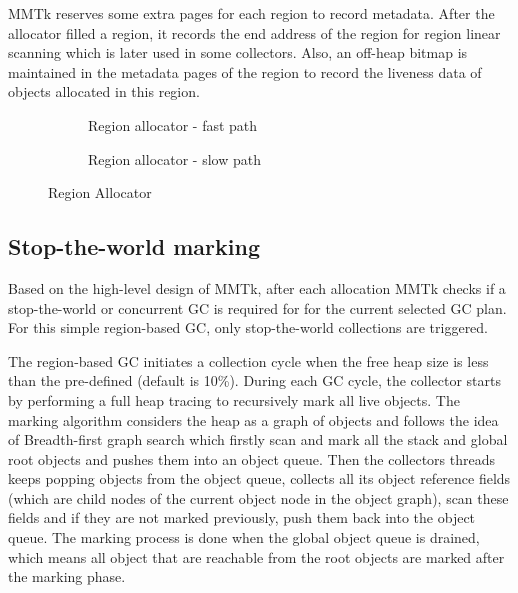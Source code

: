 MMTk reserves some extra pages for each region to record metadata.
After the allocator filled a region, it records the end address of the region for 
region linear scanning which is later used in some collectors. Also, an off-heap bitmap is
maintained in the metadata pages of the region to record the liveness data of objects allocated
in this region.

\begin{figure}
  \centering
  \begin{subfigure}[a]{\textwidth}
    
    \caption{Region allocator - fast path}
    \label{fig:allocator:fast}
  \end{subfigure}

  \begin{subfigure}[b]{\textwidth}
    
    \caption{Region allocator - slow path}
    \label{fig:allocator:slow}
  \end{subfigure}

  \caption{Region Allocator}
  \label{fig:allocator}
\end{figure}

\subsection{Stop-the-world marking}

Based on the high-level design of MMTk, after each allocation MMTk checks if a stop-the-world
or concurrent GC is required for for the current selected GC plan.
For this simple region-based GC, only stop-the-world collections are triggered.

The region-based GC initiates a collection cycle when the free heap size is less than
the pre-defined  (default is 10\%). During each GC cycle,
the collector starts by performing a full heap tracing to recursively mark all live objects.
The marking algorithm considers the heap as a graph of objects and follows the idea of Breadth-first graph search
which firstly scan and mark all the stack and global root objects and pushes them into an object queue.
Then the collectors threads keeps popping objects from the object queue, collects all its
object reference fields (which are child nodes of the current object node in the object graph), scan these
fields and if they are not marked previously, push them back into the object queue.
The marking process is done when the global object queue is drained, which means all object that are reachable
from the root objects are marked after the marking phase.

